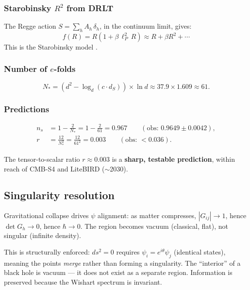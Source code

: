 \subsubsection{Starobinsky $R^2$ from DRLT}

The Regge action $S = \sum_h A_h\,\delta_h$, in the continuum limit, gives:
\begin{equation}
f(R) = R(1 + \beta\,\ell_P^2\,R) \approx R + \beta R^2 + \cdots
\end{equation}
This is the Starobinsky model \cite{Starobinsky}.

\subsubsection{Number of $e$-folds}

\begin{equation}
N_* = (d^2 - \log_d(c \cdot d_S)) \times \ln d \approx 37.9 \times 1.609 \approx 61.
\end{equation}

\subsubsection{Predictions}
\begin{align}
n_s &= 1 - \frac{2}{N_*} = 1 - \frac{2}{61} = 0.967 \qquad (\text{obs: } 0.9649 \pm 0.0042), \\
r &= \frac{12}{N_*^2} = \frac{12}{61^2} = 0.003 \qquad (\text{obs: } < 0.036).
\end{align}

The tensor-to-scalar ratio $r \approx 0.003$ is a \textbf{sharp, testable prediction}, within reach of CMB-S4 and LiteBIRD ($\sim$2030).

\subsection{Singularity resolution}

Gravitational collapse drives $\psi$ alignment: as matter compresses, $|G_{ij}| \to 1$, hence $\det G_h \to 0$, hence $\hbar \to 0$. The region becomes vacuum (classical, flat), not singular (infinite density).

This is structurally enforced: $ds^2 = 0$ requires $\psi_i = e^{i\theta}\psi_j$ (identical states), meaning the points \emph{merge} rather than forming a singularity. The ``interior'' of a black hole is vacuum --- it does not exist as a separate region. Information is preserved because the Wishart spectrum is invariant.

